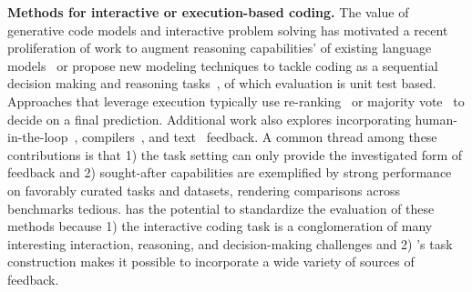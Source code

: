 \textbf{Methods for interactive or execution-based coding.} The value of generative code models and interactive problem solving has motivated a recent proliferation of work to augment reasoning capabilities' of existing language models~\cite{yao2023react, shinn2023reflexion, wang2023planandsolve, yao2023tree, zhang2023planning, chen2023teaching} or propose new modeling techniques to tackle coding as a sequential decision making and reasoning tasks~\cite{bunel2018leveraging, Chen2018ExecutionGuidedNP, ellis2019write, alphacode, chen2022codet, le2022coderl}, of which evaluation is unit test based.
Approaches that leverage execution typically use re-ranking~\cite{zhang2022coder, ni2023lever, yin-neubig-2019-reranking, zeng2022nbest} or majority vote~\cite{Chen2018ExecutionGuidedNP, alphacode, shi2022natural} to decide on a final prediction.
Additional work also explores incorporating human-in-the-loop~\cite{chen2023improving, lahiri2022interactive}, compilers~\cite{wang2022compilable}, and text~\cite{wang2023leti} feedback.
A common thread among these contributions is that 1) the task setting can only provide the investigated form of feedback and 2) sought-after capabilities are exemplified by strong performance on favorably curated tasks and datasets, rendering comparisons across benchmarks tedious.
\benchmark{} has the potential to standardize the evaluation of these methods because 1) the interactive coding task is a conglomeration of many interesting interaction, reasoning, and decision-making challenges and 2) \benchmark{}'s task construction makes it possible to incorporate a wide variety of sources of feedback.

















